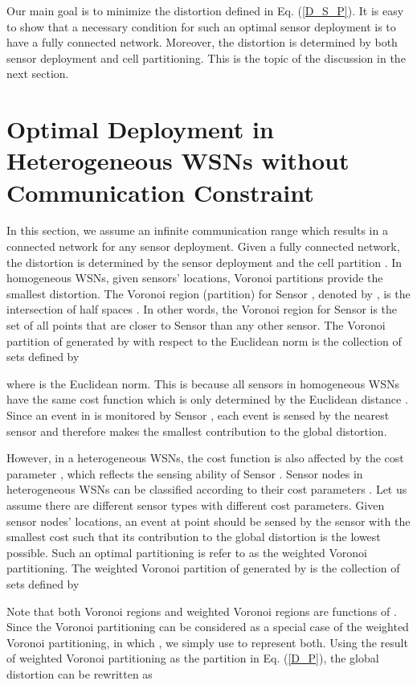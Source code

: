 \documentclass[journal,draftcls,onecolumn,12pt,twoside, narroweqnarray]{IEEEtran}
\begin{document}
Our main goal is to minimize the distortion defined in Eq. (\ref{D_S_P}). It is easy to show that a necessary condition for such an optimal sensor deployment is to have a fully connected network. Moreover, the distortion is determined by both sensor deployment and cell partitioning. This is the topic of the  discussion in the next section.

\section{Optimal Deployment in Heterogeneous WSNs without Communication Constraint}
In this section, we assume an infinite communication range which results in a connected network for any sensor deployment. Given a fully connected network, the distortion  is determined by the sensor deployment  and the cell partition . In homogeneous WSNs, given sensors' locations, Voronoi partitions provide the smallest distortion. The Voronoi region (partition) for Sensor , denoted by , is the intersection of half spaces . In other words, the Voronoi region for Sensor  is the set of all points that are closer to Sensor  than any other sensor. The Voronoi partition of  generated by  with respect to the Euclidean norm is the collection of sets  defined by

where  is the Euclidean norm. This is because all sensors in homogeneous WSNs have the same cost function  which is only determined by the Euclidean distance . Since an event in  is monitored by Sensor , each event is sensed by the nearest sensor and therefore makes the smallest contribution to the global distortion.


However, in a heterogeneous WSNs, the cost function  is also affected by the cost parameter , which reflects the sensing ability of Sensor . Sensor nodes in heterogeneous WSNs can be classified according to their cost parameters . Let us assume there are  different sensor types with  different cost parameters. Given sensor nodes' locations, an event at point  should be sensed by the sensor with the smallest cost such that its contribution to the global distortion is the lowest possible. Such an optimal partitioning  is refer to as the weighted Voronoi partitioning. The weighted Voronoi partition of  generated by  is the collection of sets  defined by

Note that both Voronoi regions  and weighted Voronoi regions  are functions of . Since the Voronoi partitioning can be considered as a special case of the weighted Voronoi partitioning, in which , we simply use  to represent both. Using the result of weighted Voronoi partitioning as the partition in Eq. (\ref{D_P}), the global distortion can be rewritten as
\end{document}
